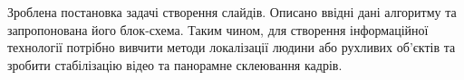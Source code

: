 \chapterConclusion

Зроблена постановка задачі створення слайдів. Описано ввідні
дані алгоритму та запропонована його блок-схема.
Таким чином, для створення інформаційної технології
потрібно вивчити методи локалізації людини або рухливих об'єктів та
зробити стабілізацію відео та панорамне склеювання кадрів.